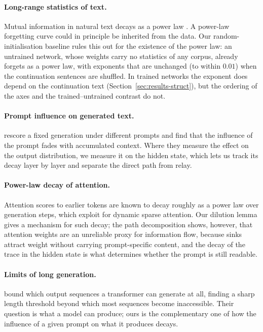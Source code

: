 \documentclass[11pt]{article}
\theoremstyle{definition}
\theoremstyle{remark}
\begin{document}
\paragraph{Long-range statistics of text.} Mutual information in natural text decays as a power law \citep{lin2017critical,chen2025l2m}. A power-law forgetting curve could in principle be inherited from the data. Our random-initialisation baseline rules this out for the existence of the power law: an untrained network, whose weights carry no statistics of any corpus, already forgets as a power law, with exponents that are unchanged (to within $0.01$) when the continuation sentences are shuffled. In trained networks the exponent does depend on the continuation text (Section~\ref{sec:results-struct}), but the ordering of the axes and the trained--untrained contrast do not.

\paragraph{Prompt influence on generated text.} \citet{prodperc2026} rescore a fixed generation under different prompts and find that the influence of the prompt fades with accumulated context. Where they measure the effect on the output distribution, we measure it on the hidden state, which lets us track its decay layer by layer and separate the direct path from relay.

\paragraph{Power-law decay of attention.} Attention scores to earlier tokens are known to decay roughly as a power law over generation steps, which \citet{siftattention2025} exploit for dynamic sparse attention. Our dilution lemma gives a mechanism for such decay; the path decomposition shows, however, that attention weights are an unreliable proxy for information flow, because sinks attract weight without carrying prompt-specific content, and the decay of the trace in the hidden state is what determines whether the prompt is still readable.

\paragraph{Limits of long generation.} \citet{accessible2026} bound which output sequences a transformer can generate at all, finding a sharp length threshold beyond which most sequences become inaccessible. Their question is what a model can produce; ours is the complementary one of how the influence of a given prompt on what it produces decays.
\end{document}
